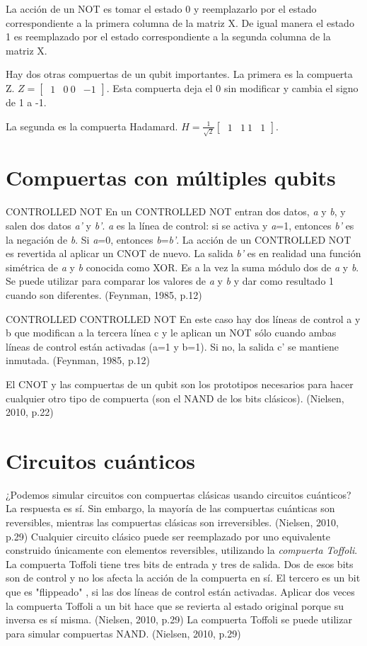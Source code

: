 \documentclass[11pt,a4paper]{article}
\begin{document}
La acción de un NOT es tomar el estado 0 y reemplazarlo por el estado correspondiente a la primera columna de la matriz X. De igual manera el estado 1 es reemplazado por el estado correspondiente a la segunda columna de la matriz X. 

Hay dos otras compuertas de un qubit importantes. 
La primera es la compuerta Z. 
$Z = \begin{bmatrix}
 \ 1 & 0
 \ 0 & -1
 \end{bmatrix}$.
Esta compuerta deja el 0 sin modificar y cambia el signo de 1 a -1.

La segunda es la compuerta Hadamard.
$H =  \frac{1}{\sqrt{2}}  \begin{bmatrix}
             \ 1 & 1
             \ 1 & 1
           \end{bmatrix}$.

\section*{Compuertas con múltiples qubits}
CONTROLLED NOT
En un CONTROLLED NOT entran dos datos, \textit{a} y \textit{b}, y salen dos datos \textit{a'} y \textit{b'}. \textit{a} es la línea de control: si se activa y \textit{a}=1, entonces \textit{b'} es la negación de \textit{b}. Si \textit{a}=0, entonces \textit{b}=\textit{b'}. La acción de un CONTROLLED NOT es revertida al aplicar un CNOT de nuevo. 
La salida \textit{b'} es en realidad una función simétrica de \textit{a} y \textit{b} conocida como XOR. Es a la vez la suma módulo dos de \textit{a} y \textit{b}. Se puede utilizar para comparar los valores de \textit{a} y \textit{b} y dar como resultado 1 cuando son diferentes. (Feynman, 1985, p.12)

CONTROLLED CONTROLLED NOT
En este caso hay dos líneas de control a y b que modifican a la tercera línea c y le aplican un NOT sólo cuando ambas líneas de control están activadas (a=1 y b=1). Si no, la salida c' se mantiene inmutada. (Feynman, 1985, p.12)

El CNOT y las compuertas de un qubit son los prototipos necesarios para hacer cualquier otro tipo de compuerta (son el NAND de los bits clásicos). (Nielsen, 2010, p.22)

\section*{Circuitos cuánticos}
¿Podemos simular circuitos con compuertas clásicas usando circuitos cuánticos? La respuesta es sí. Sin embargo, la mayoría de las compuertas cuánticas son reversibles, mientras las compuertas clásicas son irreversibles. (Nielsen, 2010, p.29)
Cualquier circuito clásico puede ser reemplazado por uno equivalente construido únicamente con elementos reversibles, utilizando la \textit{compuerta Toffoli}. La compuerta Toffoli tiene tres bits de entrada y tres de salida. Dos de esos bits son de control y no los afecta la acción de la compuerta en sí. El tercero es un bit que es "flippeado" , si las dos líneas de control están activadas. Aplicar dos veces la compuerta Toffoli a un bit hace que se revierta al estado original porque su inversa es sí misma. (Nielsen, 2010, p.29)
La compuerta Toffoli se puede utilizar para simular compuertas NAND. (Nielsen, 2010, p.29)
\end{document}

